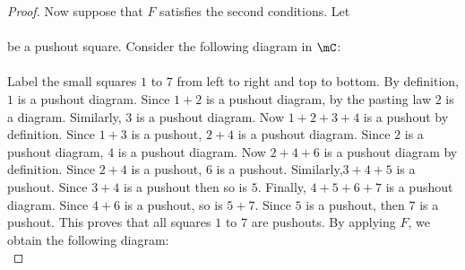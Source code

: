 \documentclass[a4paper]{article}
\begin{document}
\begin{prp}{}{}
\begin{proof}
Now suppose that $F$ satisfies the second conditions. Let \\
\\
be a pushout square. Consider the following diagram in $\mC$: \\
\\
Label the small squares $1$ to $7$ from left to right and top to bottom. By definition, $1$ is a pushout diagram. Since $1+2$ is a pushout diagram, by the pasting law $2$ is a diagram. Similarly, $3$ is a pushout diagram. Now $1+2+3+4$ is a pushout by definition. Since $1+3$ is a pushout, $2+4$ is a pushout diagram. Since $2$ is a pushout diagram, $4$ is a pushout diagram. Now $2+4+6$ is a pushout diagram by definition. Since $2+4$ is a pushout, $6$ is a pushout. Similarly,$3+4+5$ is a pushout. Since $3+4$ is a pushout then so is $5$. Finally, $4+5+6+7$ is a pushout diagram. Since $4+6$ is a pushout, so is $5+7$. Since $5$ is a pushout, then $7$ is a pushout. This proves that all squares $1$ to $7$ are pushouts. By applying $F$, we obtain the following diagram: \\
\end{proof}
\end{prp}
\end{document}
